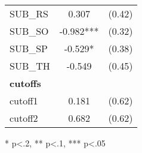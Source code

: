 \begin{table}[H]
\begin{threeparttable}
\begin{tabular}{l c c}
      SUB\_RS                               & 0.307                  & (0.42)               \\
      SUB\_SO                               & -0.982***              & (0.32)               \\
      SUB\_SP                               & -0.529*                & (0.38)               \\
      SUB\_TH                               & -0.549                 & (0.45)               \\
      \hline
      \textbf{cutoffs}                      &                        &                      \\           
      cutoff1                               & 0.181                  & (0.62)               \\
      cutoff2                               & 0.682                  & (0.62)               \\
      \hline
      \hline
    \end{tabular}
    \begin{tablenotes}
    \item{* p<.2, ** p<.1, *** p<.05}
    \end{tablenotes}
  \end{threeparttable}
\end{table}

\clearpage{}

\newpage{}

